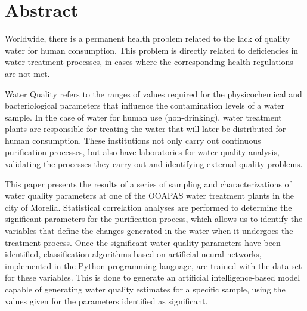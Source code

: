 \chapter*{Abstract} %

Worldwide, there is a permanent health problem related to the lack of quality water for human consumption. This problem is directly related to deficiencies in water treatment processes, in cases where the corresponding health 
regulations are not met.

Water Quality refers to the ranges of values required for the physicochemical and bacteriological parameters that influence the contamination levels of a water sample.
In the case of water for human use (non-drinking), water treatment plants are responsible for treating the water that will later be distributed for human consumption.
These institutions not only carry out continuous purification processes, but also have laboratories for water quality analysis, validating the processes they carry out and identifying external quality problems.

This paper presents the results of a series of sampling and characterizations of water quality parameters at one of the OOAPAS water treatment plants in the city of Morelia.
Statistical correlation analyses are performed to determine the significant parameters for the purification process, which allows us to identify the variables that define the changes generated in the water when it undergoes the treatment process.
Once the significant water quality parameters have been identified, classification algorithms based on artificial neural networks, implemented in the Python programming language, are trained with the data set for these variables. 
This is done to generate an artificial intelligence-based model capable of generating water quality estimates for a specific sample, using the values given for the parameters identified as significant.
